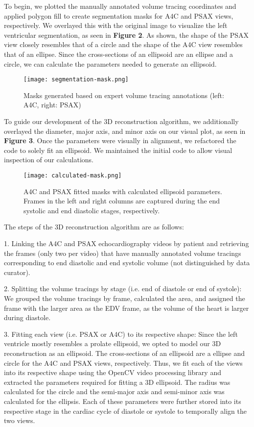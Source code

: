 \documentclass{article}
\begin{document}
To begin, we plotted the manually annotated volume tracing coordinates and applied polygon fill to create segmentation masks for A4C and PSAX views, respectively. We overlayed this with the original image to visualize the left ventricular segmentation, as seen in \textbf{Figure 2}. As shown, the shape of the PSAX view closely resembles that of a circle and the shape of the A4C view resembles that of an ellipse. Since the cross-sections of an ellipsoid are an ellipse and a circle, we can calculate the parameters needed to generate an ellipsoid.

\begin{figure} [h]
  \centering
\texttt{[image: segmentation-mask.png]}
  \caption{Masks generated based on expert volume tracing annotations (left: A4C, right: PSAX) }
\end{figure}

To guide our development of the 3D reconstruction algorithm, we additionally overlayed the diameter, major axis, and minor axis on our visual plot, as seen in \textbf{Figure 3}. Once the parameters were visually in alignment, we refactored the code to solely fit an ellipsoid. We maintained the initial code to allow visual inspection of our calculations. 

\begin{figure} [H]
  \centering
  \texttt{[image: calculated-mask.png]}
  \caption{A4C and PSAX fitted masks with calculated ellipsoid parameters. Frames in the left and right columns are captured during the end systolic and end diastolic stages, respectively.}
\end{figure}


The steps of the 3D reconstruction algorithm are as follows:

1. Linking the A4C and PSAX echocardiography videos by patient and retrieving the frames (only two per video) that have manually annotated volume tracings corresponding to end diastolic and end systolic volume (not distinguished by data curator). 

2. Splitting the volume tracings by stage (i.e. end of diastole or end of systole): We grouped the volume tracings by frame, calculated the area, and assigned the frame with the larger area as the EDV frame, as the volume of the heart is larger during diastole.  

3. Fitting each view (i.e. PSAX or A4C) to its respective shape: Since the left ventricle mostly resembles a prolate ellipsoid\cite{lvshape,rajan2016}, we opted to model our 3D reconstruction as an ellipsoid. The cross-sections of an ellipsoid are a ellipse and circle for the A4C and PSAX views, respectively. Thus, we fit each of the views into its respective shape using the OpenCV video processing library \cite{opencv} and extracted the parameters required for fitting a 3D ellipsoid. The radius was calculated for the circle and the semi-major axis and semi-minor axis was calculated for the ellipsis. Each of these parameters were further stored into its respective stage in the cardiac cycle of diastole or systole to temporally align the two views.
\end{document}
